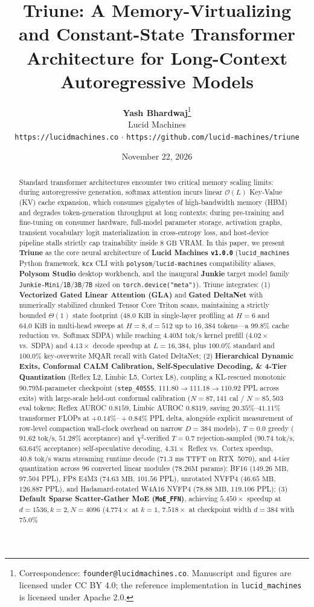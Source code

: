 \documentclass[10pt,twocolumn,letterpaper]{article}
\title{\textbf{Triune: A Memory-Virtualizing and Constant-State Transformer Architecture for Long-Context Autoregressive Models}}
\author{
    \textbf{Yash Bhardwaj}\thanks{Correspondence: \texttt{founder@lucidmachines.co}. Manuscript and figures are licensed under CC BY 4.0; the reference implementation in \texttt{lucid\_machines} is licensed under Apache 2.0.} \\
    Lucid Machines \\
    \texttt{https://lucidmachines.co} \;$\cdot$\; \texttt{https://github.com/lucid-machines/triune}
}
\date{November 22, 2026}
\begin{document}
\maketitle

\begin{abstract}
Standard transformer architectures encounter two critical memory scaling limits: during autoregressive generation, softmax attention incurs linear $\mathcal{O}(L)$ Key-Value (KV) cache expansion, which consumes gigabytes of high-bandwidth memory (HBM) and degrades token-generation throughput at long contexts; during pre-training and fine-tuning on consumer hardware, full-model parameter storage, activation graphs, transient vocabulary logit materialization in cross-entropy loss, and host-device pipeline stalls strictly cap trainability inside $8\text{ GB}$ VRAM. In this paper, we present \textbf{Triune} as the core neural architecture of \textbf{Lucid Machines \texttt{v1.0.0}} (\texttt{lucid\_machines} Python framework, \texttt{kcx} CLI with \texttt{polysom}/\texttt{lucid-machines} compatibility aliases, \textbf{Polysom Studio} desktop workbench, and the inaugural \textbf{Junkie} target model family \texttt{Junkie-Mini}/\texttt{1B}/\texttt{3B}/\texttt{7B} sized on \texttt{torch.device("meta")}). Triune integrates: (1) \textbf{Vectorized Gated Linear Attention (GLA)} and \textbf{Gated DeltaNet} with numerically stabilized chunked Tensor Core Triton scans, maintaining a strictly bounded $\Theta(1)$ state footprint ($48.0\text{ KiB}$ in single-layer profiling at $H=6$ and $64.0\text{ KiB}$ in multi-head sweeps at $H=8, d=512$ up to $16,384$ tokens---a $99.8\%$ cache reduction vs.\ Softmax SDPA) while reaching $4.40\text{M tok/s}$ kernel prefill ($4.02\times$ vs.\ SDPA) and $4.13\times$ decode speedup at $L=16,384$, plus $100.0\%$ standard and $100.0\%$ key-overwrite MQAR recall with Gated DeltaNet; (2) \textbf{Hierarchical Dynamic Exits, Conformal CALM Calibration, Self-Speculative Decoding, \& 4-Tier Quantization} (Reflex L2, Limbic L5, Cortex L8), coupling a KL-rescued monotonic $90.79\text{M}$-parameter checkpoint (\texttt{step\_40555}, $111.80 \to 111.18 \to 110.92$ PPL across exits) with large-scale held-out conformal calibration ($N=87,141$ cal / $N=85,503$ eval tokens; Reflex AUROC $0.8159$, Limbic AUROC $0.8319$, saving $20.35\%\text{--}41.11\%$ transformer FLOPs at $+0.14\%\text{--}+0.84\%$ PPL delta, alongside explicit measurement of row-level compaction wall-clock overhead on narrow $D=384$ models), $T=0.0$ greedy ($91.62\text{ tok/s}$, $51.28\%$ acceptance) and $\chi^2$-verified $T=0.7$ rejection-sampled ($90.74\text{ tok/s}$, $63.64\%$ acceptance) self-speculative decoding, $4.31\times$ Reflex vs.\ Cortex speedup, $40.8\text{ tok/s}$ warm streaming runtime decode ($71.3\text{ ms}$ TTFT on RTX~5070), and 4-tier quantization across $96$ converted linear modules ($78.26\text{M}$ params): BF16 ($149.26\text{ MB}$, $97.504$ PPL), FP8 E4M3 ($74.63\text{ MB}$, $101.56$ PPL), unrotated NVFP4 ($46.65\text{ MB}$, $126.887$ PPL), and Hadamard-rotated W4A16 NVFP4 ($78.88\text{ MB}$, $119.106$ PPL); (3) \textbf{Default Sparse Scatter-Gather MoE (\texttt{MoE\_FFN})}, achieving $5.450\times$ speedup at $d=1536, k=2, N=4096$ ($4.774\times$ at $k=1$, $7.518\times$ at checkpoint width $d=384$ with $75.0\%$ 
\end{abstract}
\end{document}
